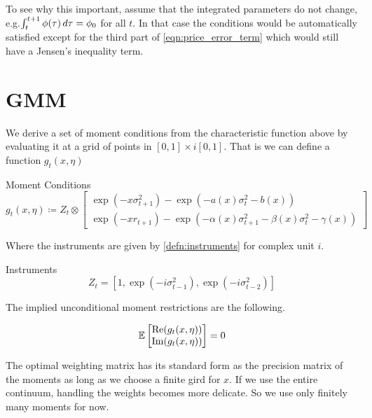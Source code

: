 \documentclass[11pt, letterpaper, twoside, final]{article}
\begin{document}
To see why this important, assume that the integrated parameters do not change, e.g.\@ $\int_{t}^{t+1} \phi(\tau)
\mathop{}\!d \tau = \phi_0$ for all $t$.
In that case the conditions would be automatically satisfied except for the third part of
\cref{eqn:price_error_term} which would still have a Jensen's inequality term.





\section{GMM}\label{sec:GMM}

We derive a set of moment conditions from the characteristic function above by evaluating it at a grid of points
in $[0,1] \times i [0,1]$. 
That is we can define a function $g_t(x, \eta)$

\begin{defn}{Moment Conditions}
    \begin{equation}
        g_t(x, \eta) \coloneqq Z_t \otimes \begin{bmatrix} \exp(- x \sigma^2_{t+1}) - \exp\left( - a(x) \sigma_t^2
        - b(x) \right) \\ \exp\left(- x r_{t+1}\right) - \exp\left(- \alpha(x) \sigma^2_{t+1} - \beta(x)
        \sigma^2_t - \gamma(x)\right) \end{bmatrix}
    \end{equation}
\end{defn}

Where the instruments are given by \cref{defn:instruments} for complex unit $i$. 

\begin{defn}{Instruments}
    \label{defn:instruments}
    \begin{equation}
        Z_t = \left[1, \exp\left(- i \sigma_{t-1}^2\right), \exp\left(-i \sigma^2_{t-2}\right)\right] 
    \end{equation}
\end{defn}

The implied unconditional moment restrictions are the following.  

\begin{equation}
    \operatorname{\mathbb{E}} \begin{bmatrix}  \mathrm{Re} (g_t(x, \eta)) \\ \mathrm{Im} (g_t(x, \eta)) \end{bmatrix} = 0
\end{equation}


The optimal weighting matrix has its standard form as the precision matrix of the moments as long as we choose a
finite gird for $x$. 
If we use the entire continuum, handling the weights becomes more delicate. 
So we use only finitely many moments for now.
\end{document}
